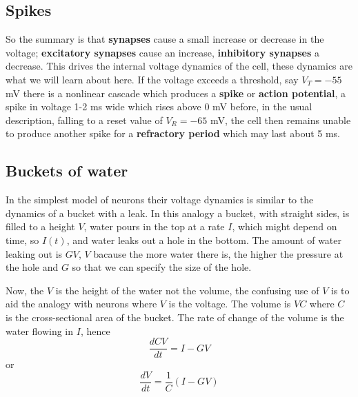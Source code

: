 \documentclass[11pt,a4paper]{scrartcl}
\begin{document}
\subsection*{Spikes}

So the summary is that \textbf{synapses} cause a small increase or
decrease in the voltage; \textbf{excitatory synapses} cause an
increase, \textbf{inhibitory synapses} a decrease. This drives the
internal voltage dynamics of the cell, these dynamics are what we will
learn about here. If the voltage exceeds a threshold, say $V_T=-55$ mV
there is a nonlinear cascade which produces a \textbf{spike} or
\textbf{action potential}, a spike in voltage 1-2 ms wide which rises
above 0 mV before, in the usual description, falling to a reset value
of $V_R=-65$ mV, the cell then remains unable to produce another spike
for a \textbf{refractory period} which may last about 5 ms.

\subsection*{Buckets of water}

In the simplest model of neurons their voltage dynamics is similar to
the dynamics of a bucket with a leak. In this analogy a bucket, with
straight sides, is filled to a height $V$, water pours in the top at a
rate $I$, which might depend on time, so $I(t)$, and water leaks out a hole
in the bottom. The amount of water leaking out is $GV$, $V$ bacause
the more water there is, the higher the pressure at the hole and $G$
so that we can specify the size of the hole.

Now, the $V$ is the height of the water not the volume, the confusing
use of $V$ is to aid the analogy with neurons where $V$ is the
voltage. The volume is $VC$ where $C$ is the cross-sectional area of the bucket. The rate of change of the volume is the water flowing in $I$, hence
\begin{equation}
\frac{dCV}{dt}=I-GV
\end{equation}
or
\begin{equation}
\frac{dV}{dt}=\frac{1}{C}(I-GV)
\end{equation}
\end{document}
